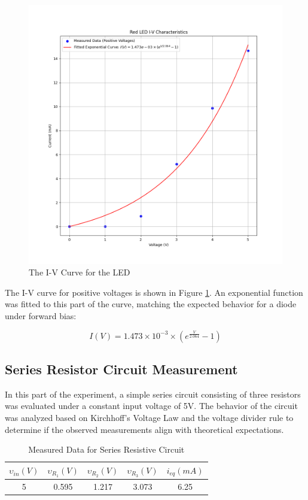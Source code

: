 \documentclass[12pt]{article}
\begin{document}
\begin{figure}[H]
	\center
	\includegraphics[width=13cm]{01_2}
	\caption{The I-V Curve for the LED}
	\label{fig:ex2}
\end{figure}

The I-V curve for positive voltages is shown in Figure \ref{fig:ex2}. An exponential function was fitted to this part of the curve, matching the expected behavior for a diode under forward bias:

\[ I(V) = 1.473 \times 10^{-3} \times (e^{\frac{V}{2.064}} - 1) \]

\subsection{Series Resistor Circuit Measurement}
In this part of the experiment, a simple series circuit consisting of three
resistors was evaluated under a constant input voltage of 5V. The behavior of
the circuit was analyzed based on Kirchhoff's Voltage Law and the voltage
divider rule to determine if the observed measurements align with theoretical
expectations.

\begin{table}[H]
	\centering
	\begin{tabular}{|c||c|c|c|c|}
		\hline
		\textbf{\(\upsilon_{in} (V)\)}  & \textbf{\(\upsilon_{R_1} (V)\)} &
		\textbf{\(\upsilon_{R_2} (V)\)} & \textbf{\(\upsilon_{R_3} (V)\)} &
		\textbf{\(i_{eq} (mA)\)}                                                                 \\
		\hline
		5                               & 0.595                           & 1.217 & 3.073 & 6.25 \\
		\hline
	\end{tabular}
	\caption{Measured Data for Series Resistive Circuit}
	\label{tab:series_data}
\end{table}
\end{document}
